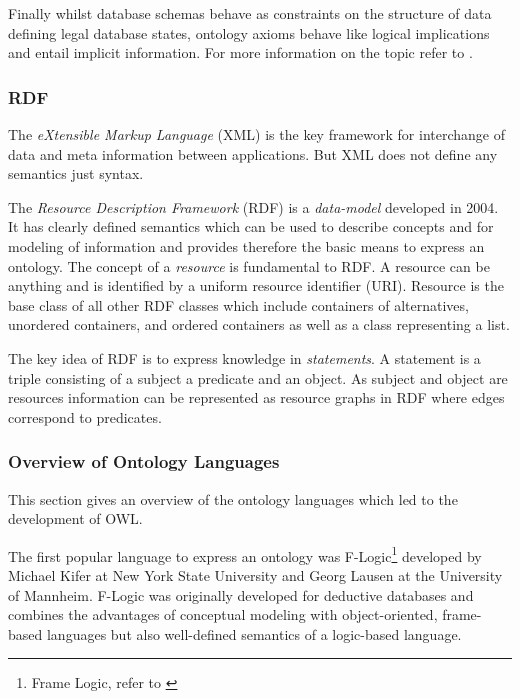 Finally whilst database schemas behave as constraints on the structure of
data defining legal database states, ontology axioms behave like logical
implications and entail implicit information.
For more information on the topic refer to \cite{horrocks2008}.

\subsubsection{RDF}
The \emph{eXtensible Markup Language} (XML) is the key framework for interchange
of data and meta information between applications. But XML does not define
any semantics just syntax.

The \emph{Resource Description Framework} (RDF) is a \emph{data-model}
developed in 2004.
It has clearly defined semantics which can be used to describe concepts and for modeling
of information and provides therefore the basic means to express an ontology.
The concept of a \emph{resource} is fundamental to RDF. A resource can be anything
and is identified by a uniform resource identifier (URI).
Resource is the base class of all other RDF classes which include containers
of alternatives, unordered containers, and ordered containers as well as a class
representing a list.

The key idea of RDF is to express knowledge in \emph{statements}.
A statement is a triple consisting of a subject a predicate and an object.
As subject and object are resources information can be represented as resource
graphs in RDF where edges correspond to predicates.

\subsubsection{Overview of Ontology Languages}
This section gives an overview of the ontology languages which led to the development of OWL.

The first popular language to express an ontology was F-Logic\footnote{Frame Logic, refer to
\cite{KiferLausen1995}} developed by Michael Kifer at New York
State University and Georg Lausen at the University of Mannheim.
F-Logic was originally developed for deductive databases and combines the advantages of conceptual
modeling with object-oriented, frame-based languages but also well-defined semantics of a logic-based
language.

